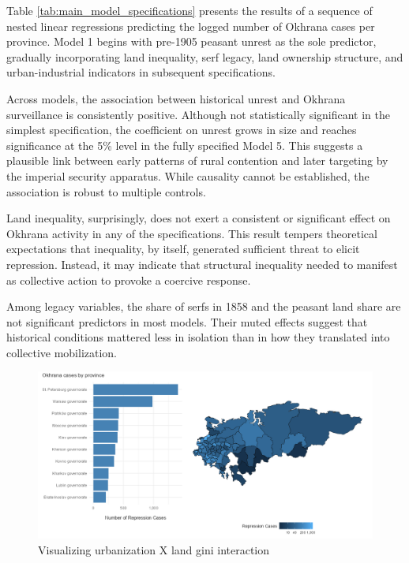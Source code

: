 \documentclass[11pt]{scrarticle}
\begin{document}
Table \ref{tab:main_model_specifications} presents the results of a sequence of nested linear regressions predicting the logged number of Okhrana cases per province. Model 1 begins with pre-1905 peasant unrest as the sole predictor, gradually incorporating land inequality, serf legacy, land ownership structure, and urban-industrial indicators in subsequent specifications.

Across models, the association between historical unrest and Okhrana surveillance is consistently positive. Although not statistically significant in the simplest specification, the coefficient on unrest grows in size and reaches significance at the 5\% level in the fully specified Model 5. This suggests a plausible link between early patterns of rural contention and later targeting by the imperial security apparatus. While causality cannot be established, the association is robust to multiple controls.

Land inequality, surprisingly, does not exert a consistent or significant effect on Okhrana activity in any of the specifications. This result tempers theoretical expectations that inequality, by itself, generated sufficient threat to elicit repression. Instead, it may indicate that structural inequality needed to manifest as collective action to provoke a coercive response.

Among legacy variables, the share of serfs in 1858 and the peasant land share are not significant predictors in most models. Their muted effects suggest that historical conditions mattered less in isolation than in how they translated into collective mobilization.

\begin{figure}
  \centering
  \caption{Visualizing urbanization X land gini interaction}
  \label{fig:visualizing_urbanization_x_land_gini_interaction}
  \includegraphics[width = \textwidth]{okhrana_by_province.png}
\end{figure}
\end{document}
